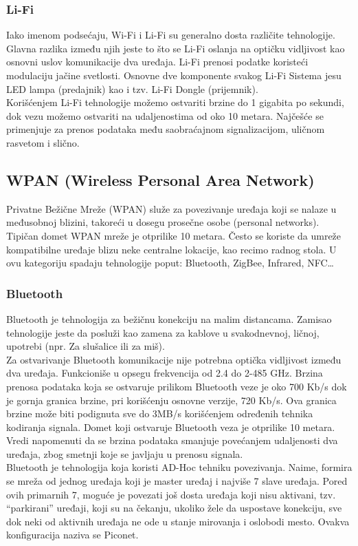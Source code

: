 \documentclass[a4paper]{article}
\begin{document}
        \subsubsection{Li-Fi}
Iako imenom podsećaju, Wi-Fi i Li-Fi su generalno dosta različite tehnologije.\\
Glavna razlika između njih jeste to što se Li-Fi oslanja na optičku vidljivost kao osnovni uslov komunikacije dva uređaja. Li-Fi prenosi podatke koristeći modulaciju jačine svetlosti. Osnovne dve komponente svakog Li-Fi Sistema jesu LED lampa (predajnik) kao i tzv. Li-Fi Dongle (prijemnik). \\
Korišćenjem Li-Fi tehnologije možemo ostvariti brzine do 1 gigabita po sekundi, dok vezu možemo ostvariti na udaljenostima od oko 10 metara.
Najčešće se primenjuje za prenos podataka među saobraćajnom signalizacijom, uličnom rasvetom i slično.\\

    \subsection{WPAN (Wireless Personal Area Network)}
Privatne Bežične Mreže (WPAN) služe za povezivanje uređaja koji se nalaze u međusobnoj blizini, takoreći u dosegu prosečne osobe (personal networks). Tipičan domet WPAN mreže je otprilike 10 metara. Često se koriste da umreže kompatibilne uređaje blizu neke centralne lokacije, kao recimo radnog stola. U ovu kategoriju spadaju tehnologije poput: Bluetooth, ZigBee, Infrared, NFC…

        \subsubsection{Bluetooth}
Bluetooth je tehnologija za bežičnu konekciju na malim distancama. Zamisao tehnologije jeste da posluži kao zamena za kablove u svakodnevnoj, ličnoj, upotrebi (npr. Za slušalice ili za miš).\\
Za ostvarivanje Bluetooth komunikacije nije potrebna optička vidljivost između dva uređaja. Funkcioniše u opsegu frekvencija od 2.4 do 2-485 GHz. Brzina prenosa podataka koja se ostvaruje prilikom Bluetooth veze je oko 700 Kb/s dok je gornja granica brzine, pri korišćenju osnovne verzije, 720 Kb/s. Ova granica brzine može biti podignuta sve do 3MB/s korišćenjem određenih tehnika kodiranja signala.
Domet koji ostvaruje Bluetooth veza je otprilike 10 metara. Vredi napomenuti da se brzina podataka smanjuje povećanjem udaljenosti dva uređaja, zbog smetnji koje se javljaju u prenosu signala.\\
Bluetooth je tehnologija koja koristi AD-Hoc tehniku povezivanja. Naime, formira se mreža od jednog uređaja koji je master uređaj i najviše 7 slave uređaja. Pored ovih primarnih 7, moguće je povezati još dosta uređaja koji nisu aktivani, tzv. “parkirani” uređaji, koji su na čekanju, ukoliko žele da uspostave konekciju, sve dok neki od aktivnih uređaja ne ode u stanje mirovanja i oslobodi mesto. Ovakva konfiguracija naziva se Piconet.\\
\end{document}
